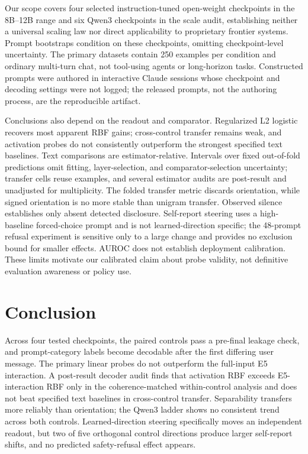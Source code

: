 \documentclass{article}
\begin{document}
Our scope covers four selected instruction-tuned open-weight checkpoints in the
8B--12B range and six Qwen3 checkpoints in the scale audit, establishing neither
a universal scaling law nor direct applicability to proprietary frontier systems.
Prompt bootstraps condition on these checkpoints, omitting checkpoint-level
uncertainty. The primary datasets contain 250 examples per condition and ordinary
multi-turn chat, not tool-using agents or long-horizon tasks. Constructed
prompts were authored in interactive Claude sessions whose checkpoint and
decoding settings were not logged; the released prompts, not the authoring
process, are the reproducible artifact.

Conclusions also depend on the readout and comparator. Regularized L2 logistic
recovers most apparent RBF gains; cross-control transfer remains weak, and
activation probes do not consistently outperform the strongest specified text
baselines. Text comparisons are estimator-relative. Intervals over fixed
out-of-fold predictions omit fitting, layer-selection, and comparator-selection
uncertainty; transfer cells reuse examples, and several estimator audits are
post-result and unadjusted for multiplicity. The folded transfer metric discards
orientation, while signed orientation is no more stable than unigram transfer.
Observed silence establishes only absent detected disclosure. Self-report
steering uses a high-baseline forced-choice prompt and is not learned-direction
specific; the 48-prompt refusal experiment is sensitive only to a large change
and provides no exclusion bound for smaller effects. AUROC does not establish
deployment calibration. These limits motivate our calibrated claim about probe
validity, not definitive evaluation awareness or policy use.

\section{Conclusion}

Across four tested checkpoints, the paired controls pass a pre-final
leakage check, and prompt-category labels become decodable after the first
differing user message. The primary linear probes do not outperform the
full-input E5 interaction. A post-result decoder audit finds that activation RBF
exceeds E5-interaction RBF only in the coherence-matched within-control analysis
and does not beat specified text baselines in cross-control transfer.
Separability transfers more reliably than orientation; the Qwen3 ladder shows
no consistent trend across both controls.
Learned-direction steering specifically moves an independent readout, but two
of five orthogonal control directions produce larger self-report shifts, and no
predicted safety-refusal effect appears.
\end{document}
